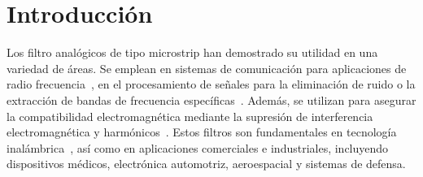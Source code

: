 \section{Introducción}
Los filtro analógicos de tipo microstrip han demostrado su utilidad en una variedad de áreas. Se emplean en sistemas de comunicación para aplicaciones de radio frecuencia~\cite{zhang2023multi}, en el procesamiento de señales para la eliminación de ruido o la extracción de bandas de frecuencia específicas~\cite{islam2021spectrum}. Además, se utilizan para asegurar la compatibilidad electromagnética mediante la supresión de interferencia electromagnética y harmónicos~\cite{kumar2023electromagnetic}. Estos filtros son fundamentales en tecnología inalámbrica~\cite{ibrahim2020compact}, así como en aplicaciones comerciales e industriales, incluyendo dispositivos médicos, electrónica automotriz, aeroespacial y sistemas de defensa.

